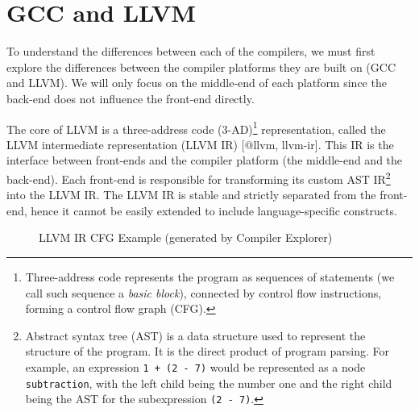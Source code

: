 \documentclass[
  11pt,
]{report}
\begin{document}
\section{GCC and LLVM}\label{gcc-and-llvm}

To understand the differences between each of the compilers, we must
first explore the differences between the compiler platforms they are
built on (GCC and LLVM). We will only focus on the middle-end of each
platform since the back-end does not influence the front-end directly.

The core of LLVM is a three-address code (3-AD)\footnote{Three-address
  code represents the program as sequences of statements (we call such
  sequence a \emph{basic block}), connected by control flow
  instructions, forming a control flow graph (CFG).} representation,
called the LLVM intermediate representation (LLVM IR) {[}@llvm,
llvm-ir{]}. This IR is the interface between front-ends and the compiler
platform (the middle-end and the back-end). Each front-end is
responsible for transforming its custom AST IR\footnote{Abstract syntax
  tree (AST) is a data structure used to represent the structure of the
  program. It is the direct product of program parsing. For example, an
  expression \texttt{1\ +\ (2\ -\ 7)} would be represented as a node
  \texttt{subtraction}, with the left child being the number one and the
  right child being the AST for the subexpression \texttt{(2\ -\ 7)}.}
into the LLVM IR. The LLVM IR is stable and strictly separated from the
front-end, hence it cannot be easily extended to include
language-specific constructs.

\begin{figure}
\centering

\caption{LLVM IR CFG Example (generated by Compiler Explorer)}
\end{figure}
\end{document}
